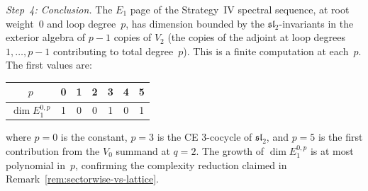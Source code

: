 \begin{computation}
\emph{Step~4: Conclusion.}
The $E_1$ page of the Strategy~IV spectral sequence, at root
weight~$0$ and loop degree~$p$, has dimension bounded by the
$\mathfrak{sl}_2$-invariants in the exterior algebra of
$p - 1$ copies of $V_2$ (the copies of the adjoint at
loop degrees $1, \ldots, p-1$ contributing to total degree~$p$).
This is a finite computation at each~$p$.  The first values are:
\begin{center}
\begin{tabular}{c|cccccc}
$p$ & 0 & 1 & 2 & 3 & 4 & 5 \\
\hline
$\dim E_1^{0,p}$ & 1 & 0 & 0 & 1 & 0 & 1 \\
\end{tabular}
\end{center}
where $p = 0$ is the constant, $p = 3$ is the CE $3$-cocycle of
$\mathfrak{sl}_2$, and $p = 5$ is the first contribution from the
$V_0$ summand at $q = 2$.  The growth of
$\dim E_1^{0,p}$ is at most polynomial in~$p$, confirming the
complexity reduction claimed in
Remark~\ref{rem:sectorwise-vs-lattice}.
\end{computation}

